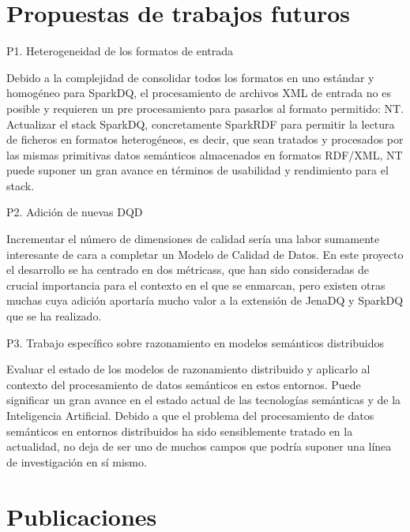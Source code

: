 \section{Propuestas de trabajos futuros}
\label{sec:ch6-future}
\begin{definitionlist}

\item[P1. Heterogeneidad de los formatos de entrada]

Debido a la complejidad de consolidar todos los
formatos en uno estándar y homogéneo para SparkDQ, el procesamiento de archivos
\acs{XML} de entrada no es posible y requieren un pre procesamiento para
pasarlos al formato permitido: \acs{NT}. Actualizar el stack SparkDQ, concretamente SparkRDF para permitir la lectura de
ficheros en formatos heterogéneos, es decir, que sean tratados y procesados por
las mismas primitivas datos semánticos almacenados en formatos
\acs{RDF}/\acs{XML}, \acs{NT} puede suponer un gran avance en términos de
usabilidad y rendimiento para el stack. 


\item[P2. Adición de nuevas \acs{DQD}]

Incrementar el número de dimensiones de calidad sería una labor sumamente
interesante de cara a completar un Modelo de Calidad de Datos. En este proyecto
el desarrollo se ha centrado en dos métricass, que han sido consideradas de
crucial importancia para el contexto en el que se enmarcan, pero existen otras
muchas cuya adición aportaría mucho valor a la extensión de JenaDQ y SparkDQ que se ha
realizado. 

\item[P3. Trabajo específico sobre razonamiento en modelos semánticos
  distribuidos]

Evaluar el estado de los modelos de razonamiento distribuido y aplicarlo al
contexto del procesamiento de datos semánticos en estos entornos. Puede
significar un gran avance en el estado actual de las tecnologías semánticas y de
la Inteligencia Artificial. Debido a que el problema del procesamiento de datos
semánticos en entornos distribuidos ha sido sensiblemente tratado en la
actualidad, no deja de ser uno de muchos campos que podría suponer una línea de
investigación en sí mismo. 

\end{definitionlist}

\section{Publicaciones}

